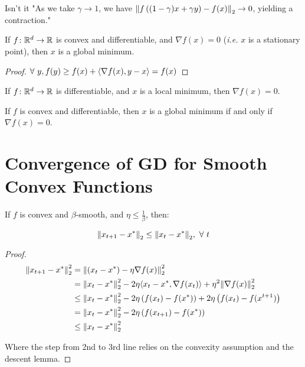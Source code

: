 \begin{remark}
    \color{red} Isn't it "As we take \(\gamma \to 1\), we have \(\norm{f\left((1- \gamma) x + \gamma y\right) - f(x)}_2 \to 0\), 
    yielding a contraction."
\end{remark}

\begin{lemma}
    If \(f \colon \mathbb{R}^d \to \mathbb{R}\) is convex and differentiable, and \(\nabla f(x) = 0\) 
    (\emph{i.e.} \(x\) is a stationary point), then \(x\) is a global minimum. 
\end{lemma}

\begin{proof}
    \(\forall \ y, f(y) \geq f(x) + \langle \nabla f(x), y - x \rangle = f(x)\)
\end{proof}

\begin{lemma}
    If \(f \colon \mathbb{R}^d \to \mathbb{R}\) is differentiable, and \(x\) is a local minimum, then 
    \(\nabla f(x) = 0\). 
\end{lemma} 


\begin{corollary}
    If \(f\) is convex and differentiable, then \(x\) is a global minimum if and only 
    if \(\nabla f(x) = 0\). 
\end{corollary}


\section{Convergence of GD for Smooth Convex Functions}



\begin{lemma} 
    If \(f\) is convex and \(\beta\)-smooth, and \(\eta \leq \frac{1}{\beta}\), then: 

    \[
        \norm{x_{t+1} - x^*}_2 \leq \norm{x_t - x^*}_2, \ \forall \ t   
    \]
\end{lemma}

\begin{proof}
    \begin{align*}
        \norm{x_{t+1} - x^*}^2_2 &= \norm{(x_{t} - x^*) - \eta \nabla f(x)}_2^2 \\ 
        &= \norm{x_{t} - x^*}_2^2 - 2 \eta \langle x_t - x^*, \nabla f(x_t) \rangle + 
        \eta^2 \norm{\nabla f(x)}_2^2 \\ 
        &\leq \norm{ x_t - x^* }_2^2 - 2 \eta \left(f(x_t) - f(x^*)\right) + 
        2 \eta \left(f(x_t) - f(x^{t+1}) \right) \\ 
        &= \norm{ x_t - x^* }_2^2 - 2 \eta \left(f(x_{t+1}) - f(x^*)\right) \\ 
        &\leq \norm{ x_t - x^* }_2^2
    \end{align*}

    Where the step from 2nd to 3rd line relies on the convexity assumption and the 
    descent lemma. 
\end{proof}

